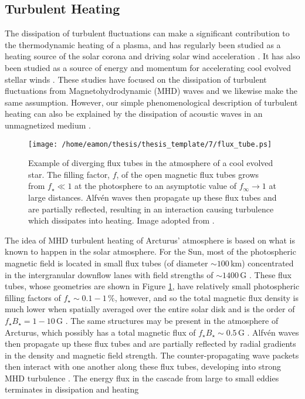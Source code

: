 \subsection{Turbulent Heating}\label{sec:7.4.3}
The dissipation of turbulent fluctuations can make a significant contribution to the thermodynamic heating of a plasma, and has regularly been studied as a heating source of the solar corona and driving solar wind acceleration \citep[e.g.,][]{lehe_2009, cranmer_2007}. It has also been studied as a source of energy and momentum for accelerating cool evolved stellar winds \citep[e.g.,][]{falceta_2006, hartmann_1980}. These studies have focused on the dissipation of turbulent fluctuations from Magnetohydrodynamic (MHD) waves and we likewise make the same assumption. However, our simple phenomenological description of turbulent heating can also be explained by the dissipation of acoustic waves in an unmagnetized medium \citep[e.g.,][]{lighthill_1952,stein_1967}.

\begin{figure}[!ht]
\centering 
         \texttt{[image: /home/eamon/thesis/thesis\_template/7/flux\_tube.ps]}
\caption[Example of diverging flux tubes]{Example of diverging flux tubes in the atmosphere of a cool evolved star. The filling factor, $f$, of the open magnetic flux tubes grows from $f_{\star} \ll 1$ at the photosphere to an asymptotic value of $f_{\infty} \rightarrow 1$ at large distances. Alfv\'en waves then propagate up these flux tubes and are partially reflected, resulting in an interaction causing turbulence which dissipates into heating. Image adopted from \cite{cranmer_2011}.}
\label{fig:7.4}
\end{figure}

The idea of MHD turbulent heating of Arcturus' atmosphere is based on what is known to happen in the solar atmosphere. For the Sun, most of the photospheric magnetic field is located in small flux tubes (of diameter $\sim 100$\,km) concentrated in the intergranular downflow lanes with field strengths of $\sim 1400$\,G \citep{berger_2001}. These flux tubes, whose geometries are shown in Figure \ref{fig:7.4}, have relatively small photospheric filling factors of $f_{\star} \sim 0.1-1\, \%$, however, and so the total magnetic flux density is much lower when spatially averaged over the entire solar disk and is the order of $f_{\star}B_{\star}=1-10$\,G \citep{schrijver_1989}. The same structures may be present in the atmosphere of Arcturus, which possibly has a total magnetic flux of $f_{\star}B_{\star} \sim 0.5$\,G \citep{Sennhauser_2011}. Alfv\'en waves then propagate up these flux tubes and are partially reflected by radial gradients in the density and magnetic field strength. The counter-propagating wave packets then interact with one another along these flux tubes, developing into strong MHD turbulence \citep{iroshnikov_1964}. The energy flux in the cascade from large to small eddies terminates in dissipation and heating \citep[e.g.,][]{matthaeus_1999, cranmer_2005} 

